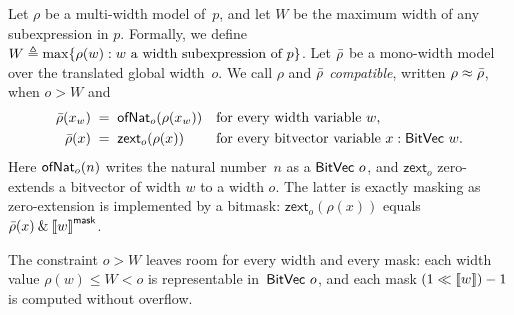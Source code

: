 \begin{definition}[Compatibility]\label{mwbv:def:compat}
Let $\rho$ be a multi-width model of~$p$, and let $W$ be the
  maximum width of any subexpression in $p$. Formally, we define $W \triangleq \max\{\rho(w) : w
\text{ a width subexpression of } p\}$.
  Let $\bar{\rho}$ be a mono-width model over the translated global width~$o$. We call
$\rho$ and $\bar{\rho}$ \emph{compatible}, written $\rho \approx \bar{\rho}$, when $o > W$
and
\begin{align*}
  \bar{\rho}(x_w) \;&=\; \mathsf{ofNat}_o(\rho(x_w)) && \text{for every width variable } w, \\
  \bar{\rho}(x)   \;&=\; \mathsf{zext}_o(\rho(x))     && \text{for every bitvector variable } x : \mathsf{BitVec}~{w}.
\end{align*}
Here $\mathsf{ofNat}_o(n)$ writes the natural number~$n$ as a $\mathsf{BitVec}~{o}$, and
$\mathsf{zext}_o$ zero-extends a bitvector of width $w$ to a width $o$.
The latter is exactly masking as zero-extension is implemented by a bitmask:
$\mathsf{zext}_o(\rho(x))$ equals $\bar{\rho}(x) \mathbin{\&} \left\llbracket w \right\rrbracket^{\mathsf{mask}}$.
\end{definition}

The constraint $o > W$ leaves room for every width and every mask: each width
value $\rho(w) \le W < o$ is representable in~$\mathsf{BitVec}~{o}$, and each mask $(1 \ll
\left\llbracket w \right\rrbracket) - 1$ is computed without overflow.

